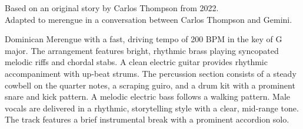 

\begin{notes}
Based on an original story by Carlos Thompson from 2022.\\
Adapted to merengue in a conversation between Carlos Thompson and Gemini.
\end{notes}
\begin{style}
Dominican Merengue with a fast, driving tempo of 200 BPM in the key of G major. %
The arrangement features bright, rhythmic brass playing syncopated melodic riffs and chordal stabs. %
A clean electric guitar provides rhythmic accompaniment with up-beat strums. %
The percussion section consists of a steady cowbell on the quarter notes, a scraping guiro, and a drum kit with a prominent snare and kick pattern. %
A melodic electric bass follows a walking pattern. %
Male vocals are delivered in a rhythmic, storytelling style with a clear, mid-range tone. %
The track features a brief instrumental break with a prominent accordion solo.
\end{style}
